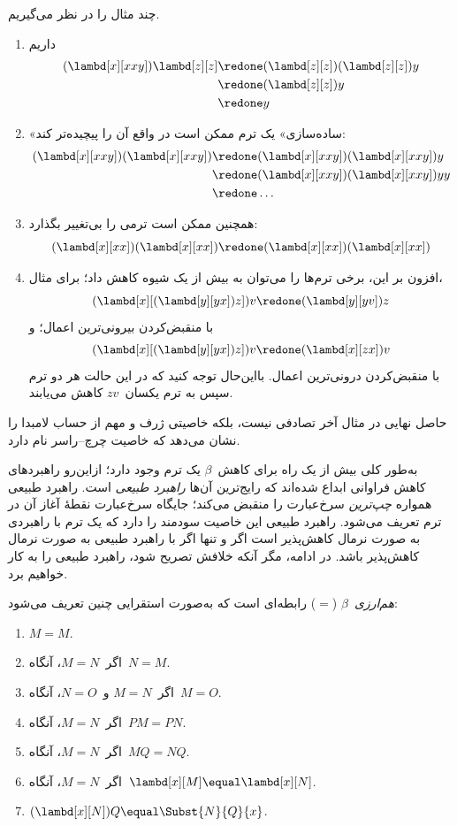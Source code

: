 \documentclass[../../../include/open-logic-section]{subfiles}
\begin{document}
چند مثال را در نظر می‌گیریم.
\begin{enumerate}
\item داریم
\begin{align*}
(\lambd[x][xxy]) \lambd[z][z] & \redone (\lambd[z][z])(\lambd[z][z]) y \\
& \redone (\lambd[z][z]) y \\
& \redone y
\end{align*}
\item «ساده‌سازی» یک ترم ممکن است در واقع آن را پیچیده‌تر کند:
\begin{align*}
(\lambd[x][xxy])(\lambd[x][xxy]) & \redone (\lambd[x][xxy])(\lambd[x][xxy])y \\
& \redone (\lambd[x][xxy])(\lambd[x][xxy])yy \\
& \redone \dots
\end{align*}
\item همچنین ممکن است ترمی را بی‌تغییر بگذارد:
\[
(\lambd[x][xx])(\lambd[x][xx]) \redone (\lambd[x][xx])(\lambd[x][xx])
\]
\item افزون بر این، برخی ترم‌ها را می‌توان به بیش از یک شیوه کاهش داد؛
  برای مثال،
\[
(\lambd[x][(\lambd[y][yx]) z]) v \redone (\lambd[y][yv]) z
\]
با منقبض‌کردن بیرونی‌ترین اعمال؛ و
\[
(\lambd[x][(\lambd[y][yx]) z]) v \redone (\lambd[x][zx]) v
\]
با منقبض‌کردن درونی‌ترین اعمال. بااین‌حال توجه کنید که در این حالت هر
دو ترم سپس به ترم یکسان~$zv$ کاهش می‌یابند.
\end{enumerate}

حاصل نهایی در مثال آخر تصادفی نیست، بلکه خاصیتی ژرف و مهم از حساب
لامبدا را نشان می‌دهد که خاصیت چرچ--راسر نام دارد.

\begin{digress}
  به‌طور کلی بیش از یک راه برای کاهش~$\beta$ یک ترم وجود دارد؛ ازاین‌رو
  راهبردهای کاهش فراوانی ابداع شده‌اند که رایج‌ترین آن‌ها
  \emph{راهبرد طبیعی} است. راهبرد طبیعی همواره \emph{چپ‌ترین}
  سرخ‌عبارت را منقبض می‌کند؛ جایگاه سرخ‌عبارت نقطهٔ آغاز آن در ترم تعریف
  می‌شود. راهبرد طبیعی این خاصیت سودمند را دارد که یک ترم با راهبردی
  به صورت نرمال کاهش‌پذیر است اگر و تنها اگر با راهبرد طبیعی به صورت
  نرمال کاهش‌پذیر باشد. در ادامه، مگر آنکه خلافش تصریح شود، راهبرد طبیعی
  را به کار خواهیم برد.
\end{digress}

\begin{defn}
  \emph{هم‌ارزی~$\beta$} ($\equal$) رابطه‌ای است که به‌صورت استقرایی
  چنین تعریف می‌شود:
  \begin{enumerate}
  \item $M \equal M$.
  \item اگر~$M \equal N$، آنگاه~$N \equal M$.
  \item اگر~$M \equal N$ و~$N \equal O$، آنگاه~$M \equal O$.
  \item اگر~$M \equal N$، آنگاه~$PM \equal PN$.
  \item اگر~$M \equal N$، آنگاه~$MQ \equal NQ$.
  \item اگر~$M \equal N$، آنگاه~$\lambd[x][M] \equal \lambd[x][N]$.
  \item $(\lambd[x][N])Q \equal \Subst{N}{Q}{x}$.
  \end{enumerate}
\end{defn}
\end{document}
